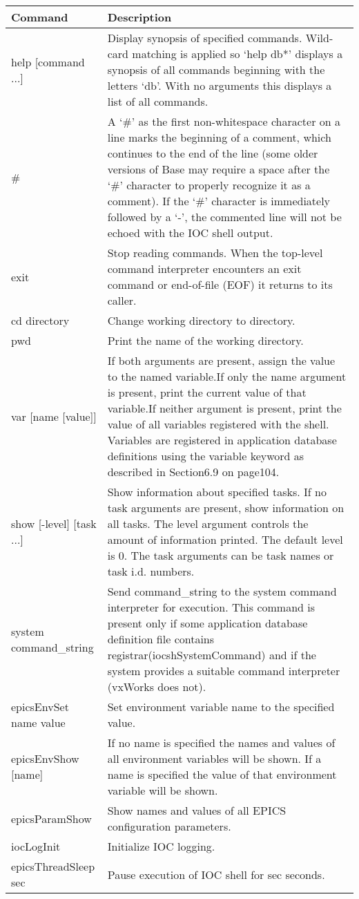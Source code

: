 \begin{center}
\begin{longtable}{p{1.5in}p{4.5in}}
Command & Description\\
\hline
help [command ...] & Display synopsis of specified commands.  Wild-card matching is applied so `help db*' displays a synopsis of all commands beginning with the letters `db'. With no arguments this displays a list of all commands.\\
\# & A `\#' as the first non-whitespace character on a line marks the beginning of a comment, which continues to the end of the line (some older versions of Base may require a space after the `\#' character to properly recognize it as a comment). If the `\#' character is immediately followed by a `-', the commented line will not be echoed with the IOC shell output.\\
exit & Stop reading commands. When the top-level command interpreter encounters an exit command or end-of-file (EOF) it returns to its caller.\\
cd directory & Change working directory to directory.\\
pwd & Print the name of the working directory.\\
var [name [value]] & If both arguments are present, assign the value to the named variable.If only the name argument is present, print the current value of that variable.If neither argument is present, print the value of all variables registered with the shell.  Variables are registered in application database definitions using the variable keyword as described in Section6.9 on page104.\\
show [-level] [task ...] & Show information about specified tasks.  If no task arguments are present, show information on all tasks.  The level argument controls the amount of information printed.  The default level is 0.  The task arguments can be task names or task i.d. numbers.\\
system command\_string & Send command\_string to the system command interpreter for execution.  This command is present only if some application database definition file contains registrar(iocshSystemCommand) and if the system provides a suitable command interpreter (vxWorks does not).\\
epicsEnvSet name value & Set environment variable name to the specified value.\\
epicsEnvShow  [name] & If no name is specified the names and values of all environment variables will be shown. If a name is specified the value of that environment variable will be shown.\\
epicsParamShow & Show names and values of all EPICS configuration parameters.\\
iocLogInit & Initialize IOC logging.\\
epicsThreadSleep sec & Pause execution of IOC shell for sec seconds.
\end{longtable}

\end{center}


